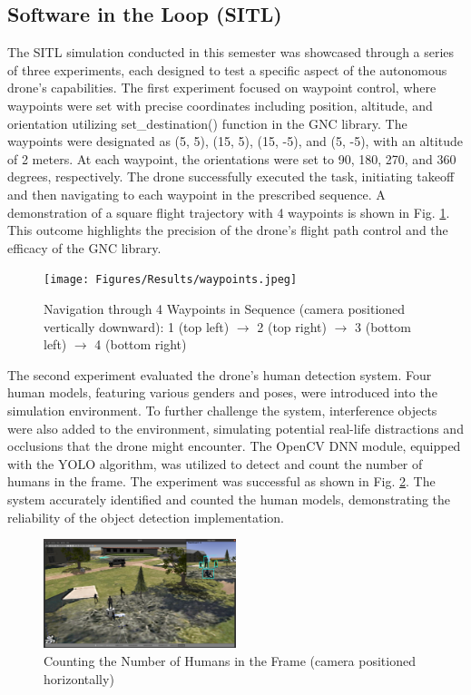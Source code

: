 \subsection{Software in the Loop (SITL)}

The SITL simulation conducted in this semester was showcased through a series of three experiments, each designed to test a specific aspect of the autonomous drone's capabilities. The first experiment focused on waypoint control, where waypoints were set with precise coordinates including position, altitude, and orientation utilizing set{\_}destination() function in the GNC library. The waypoints were designated as (5, 5), (15, 5), (15, -5), and (5, -5), with an altitude of 2 meters. At each waypoint, the orientations were set to 90, 180, 270, and 360 degrees, respectively. The drone successfully executed the task, initiating takeoff and then navigating to each waypoint in the prescribed sequence. A demonstration of a square flight trajectory with 4 waypoints is shown in Fig. \ref{fig3d1}. This outcome highlights the precision of the drone's flight path control and the efficacy of the GNC library.


\begin{figure}[H]
    \centerline{\texttt{[image: Figures/Results/waypoints.jpeg]}}
    \caption{Navigation through 4 Waypoints in Sequence (camera positioned vertically downward): 1 (top left) $\rightarrow$ 2 (top right) $\rightarrow$ 3 (bottom left) $\rightarrow$ 4 (bottom right)}
    \label{fig3d1}
\end{figure}

The second experiment evaluated the drone's human detection system. Four human models, featuring various genders and poses, were introduced into the simulation environment. To further challenge the system, interference objects were also added to the environment, simulating potential real-life distractions and occlusions that the drone might encounter. The OpenCV DNN module, equipped with the YOLO algorithm, was utilized to detect and count the number of humans in the frame. The experiment was successful as shown in Fig. \ref{fig3d2}. The system accurately identified and counted the human models, demonstrating the reliability of the object detection implementation.

\begin{figure}[H]
    \centerline{\includegraphics[width=0.5\textwidth]{Figures/Results/headcount.png}}
    \caption{Counting the Number of Humans in the Frame (camera positioned horizontally)}
    \label{fig3d2}
\end{figure}

